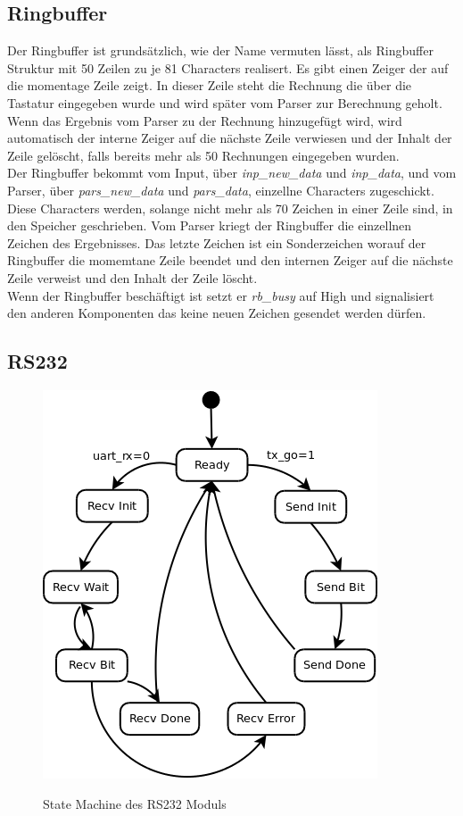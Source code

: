 \subsection{Ringbuffer}

Der Ringbuffer ist grundsätzlich, wie der Name vermuten lässt, als Ringbuffer Struktur mit 50 Zeilen
zu je 81 Characters realisert. Es gibt einen Zeiger der auf die momentage Zeile zeigt. In dieser Zeile
steht die Rechnung die über die Tastatur eingegeben wurde und wird später vom Parser zur Berechnung
geholt. Wenn das Ergebnis vom Parser zu der Rechnung hinzugefügt wird, wird automatisch der interne Zeiger
auf die nächste Zeile verwiesen und der Inhalt der Zeile gelöscht, falls bereits mehr als 50 Rechnungen
eingegeben wurden.\\
Der Ringbuffer bekommt vom Input, über \textit{inp\_new\_data} und \textit{inp\_data}, und vom Parser, 
über \textit{pars\_new\_data} und \textit{pars\_data}, einzellne Characters zugeschickt.\\
Diese Characters werden, solange nicht mehr als 70 Zeichen in einer Zeile sind, in den Speicher geschrieben.
Vom Parser kriegt der Ringbuffer die einzellnen Zeichen des Ergebnisses. Das letzte Zeichen ist ein
Sonderzeichen worauf der Ringbuffer die momemtane Zeile beendet und den internen Zeiger auf die nächste
Zeile verweist und den Inhalt der Zeile löscht.\\
Wenn der Ringbuffer beschäftigt ist setzt er \textit{rb\_busy} auf High und signalisiert den anderen
Komponenten das keine neuen Zeichen gesendet werden dürfen.


\subsection{RS232}

\begin{figure}[!ht]
 \caption{State Machine des RS232 Moduls}
 \centering
 \includegraphics[scale=0.55]{pics/RS232.png}
 \label{fig:Modules}
\end{figure}


